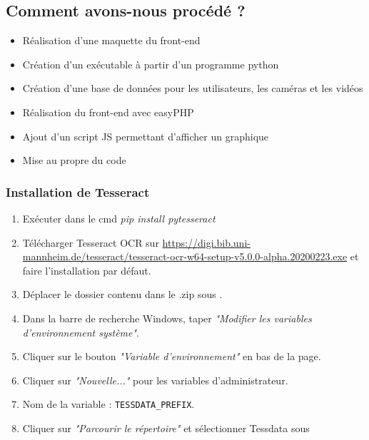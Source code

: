 \documentclass[12pt]{article}
\begin{document}
\subsection{Comment avons-nous procédé ?}
\begin{itemize}
     \item Réalisation d’une maquette du front-end
     \item Création d’un exécutable à partir d’un programme python
     \item Création d’une base de données pour les utilisateurs, les caméras et les vidéos
     \item Réalisation du front-end avec easyPHP
     \item Ajout d’un script JS permettant d’afficher un graphique
     \item Mise au propre du code
\end{itemize}

\clearpage

\subsubsection{Installation de Tesseract}
    \begin{enumerate}
        \item Exécuter dans le cmd \textit{pip install pytesseract}
         \item Télécharger Tesseract OCR sur \url{https://digi.bib.uni-mannheim.de/tesseract/tesseract-ocr-w64-setup-v5.0.0-alpha.20200223.exe} et faire l'installation par défaut.
        \item Déplacer le dossier contenu dans le .zip sous .
        \item Dans la barre de recherche Windows, taper \textit{"Modifier les variables d'environnement système"}.
        \item Cliquer sur le bouton \textit{"Variable d'environnement"} en bas de la page.
        \item Cliquer sur \textit{"Nouvelle..."} pour les variables d'administrateur.
        \item Nom de la variable : \texttt{TESSDATA\_PREFIX}.
        \item{Cliquer sur \textit{"Parcourir le répertoire"} et sélectionner Tessdata sous }
    \end{enumerate}
\end{document}
